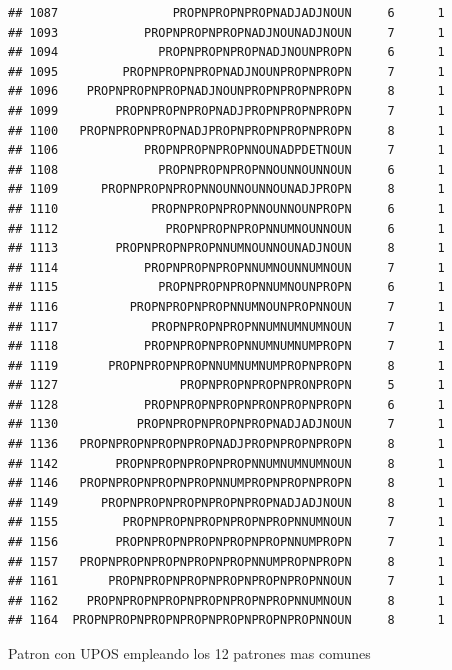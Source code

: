 \documentclass[]{article}
\begin{document}
\begin{verbatim}
## 1087                PROPNPROPNPROPNADJADJNOUN     6      1
## 1093            PROPNPROPNPROPNADJNOUNADJNOUN     7      1
## 1094              PROPNPROPNPROPNADJNOUNPROPN     6      1
## 1095         PROPNPROPNPROPNADJNOUNPROPNPROPN     7      1
## 1096    PROPNPROPNPROPNADJNOUNPROPNPROPNPROPN     8      1
## 1099        PROPNPROPNPROPNADJPROPNPROPNPROPN     7      1
## 1100   PROPNPROPNPROPNADJPROPNPROPNPROPNPROPN     8      1
## 1106            PROPNPROPNPROPNNOUNADPDETNOUN     7      1
## 1108              PROPNPROPNPROPNNOUNNOUNNOUN     6      1
## 1109      PROPNPROPNPROPNNOUNNOUNNOUNADJPROPN     8      1
## 1110             PROPNPROPNPROPNNOUNNOUNPROPN     6      1
## 1112               PROPNPROPNPROPNNUMNOUNNOUN     6      1
## 1113        PROPNPROPNPROPNNUMNOUNNOUNADJNOUN     8      1
## 1114            PROPNPROPNPROPNNUMNOUNNUMNOUN     7      1
## 1115              PROPNPROPNPROPNNUMNOUNPROPN     6      1
## 1116          PROPNPROPNPROPNNUMNOUNPROPNNOUN     7      1
## 1117             PROPNPROPNPROPNNUMNUMNUMNOUN     7      1
## 1118            PROPNPROPNPROPNNUMNUMNUMPROPN     7      1
## 1119       PROPNPROPNPROPNNUMNUMNUMPROPNPROPN     8      1
## 1127                 PROPNPROPNPROPNPRONPROPN     5      1
## 1128            PROPNPROPNPROPNPRONPROPNPROPN     6      1
## 1130           PROPNPROPNPROPNPROPNADJADJNOUN     7      1
## 1136   PROPNPROPNPROPNPROPNADJPROPNPROPNPROPN     8      1
## 1142        PROPNPROPNPROPNPROPNNUMNUMNUMNOUN     8      1
## 1146   PROPNPROPNPROPNPROPNNUMPROPNPROPNPROPN     8      1
## 1149      PROPNPROPNPROPNPROPNPROPNADJADJNOUN     8      1
## 1155         PROPNPROPNPROPNPROPNPROPNNUMNOUN     7      1
## 1156        PROPNPROPNPROPNPROPNPROPNNUMPROPN     7      1
## 1157   PROPNPROPNPROPNPROPNPROPNNUMPROPNPROPN     8      1
## 1161       PROPNPROPNPROPNPROPNPROPNPROPNNOUN     7      1
## 1162    PROPNPROPNPROPNPROPNPROPNPROPNNUMNOUN     8      1
## 1164  PROPNPROPNPROPNPROPNPROPNPROPNPROPNNOUN     8      1
\end{verbatim}

Patron con UPOS empleando los 12 patrones mas comunes
\end{document}
